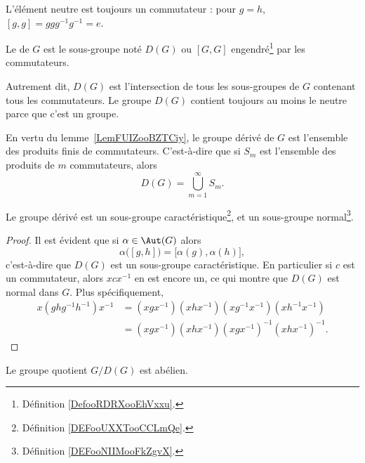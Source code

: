 L'élément neutre est toujours un commutateur : pour \( g=h \), \( [g,g]=ggg^{-1}g^{-1}=e \).

\begin{definition}      \label{DEFooBNLPooShKYXa}
	Le  de \( G\) est le sous-groupe noté \( D(G)\) ou \( [G,G]\) engendré\footnote{Définition \ref{DefooRDRXooEhVxxu}.} par les commutateurs.
\end{definition}
Autrement dit, \( D(G)\) est l'intersection de tous les sous-groupes de \( G\) contenant tous les commutateurs. Le groupe \( D(G)\) contient toujours au moins le neutre parce que c'est un groupe.

En vertu du lemme~\ref{LemFUIZooBZTCiy}, le groupe dérivé de \( G\) est l'ensemble des produits finis de commutateurs. C'est-à-dire que si \( S_m\) est l'ensemble des produits de \( m\) commutateurs, alors
\begin{equation}
	D(G)=\bigcup_{m=1}^{\infty}S_m.
\end{equation}

\begin{lemma}   \label{LemMMOCooDJJJhy}
	Le groupe dérivé est un sous-groupe caractéristique\footnote{Définition \ref{DEFooUXXTooCCLmQe}.}, et un sous-groupe normal\footnote{Définition \ref{DEFooNIIMooFkZgvX}.}.
\end{lemma}

\begin{proof}
	Il est évident que si \( \alpha\in\Aut(G)\) alors
	\begin{equation}
		\alpha\big( [g,h] \big)=\big[ \alpha(g),\alpha(h) \big],
	\end{equation}
	c'est-à-dire que \( D(G)\) est un sous-groupe caractéristique. En particulier si \( c\) est un commutateur, alors \( xcx^{-1}\) en est encore un, ce qui montre que \( D(G)\) est normal dans \( G\). Plus spécifiquement,
	\begin{subequations}
		\begin{align}
			x(ghg^{-1}h^{-1})x^{-1} & =(xgx^{-1})(xhx^{-1})(xg^{-1}x^{-1})(xh^{-1}x^{-1})  \\
			                        & =(xgx^{-1})(xhx^{-1})(xgx^{-1})^{-1}(xhx^{-1})^{-1}.
		\end{align}
	\end{subequations}
\end{proof}

\begin{proposition}\label{PropAPRGooHBkELf}
	Le groupe quotient \( G/D(G)\) est abélien.
\end{proposition}

